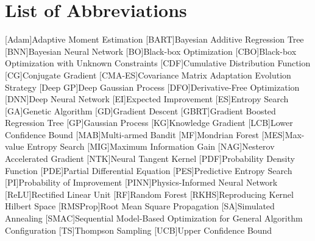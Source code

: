 \chapter*{List of Abbreviations}
{}
\begin{acronym}
        [Adam]{Adaptive Moment Estimation}
        [BART]{Bayesian Additive Regression Tree}
        [BNN]{Bayesian Neural Network}
        [BO]{Black-box Optimization}
        [CBO]{Black-box Optimization with Unknown Constraints}
        [CDF]{Cumulative Distribution Function}
        [CG]{Conjugate Gradient}
        [CMA-ES]{Covariance Matrix Adaptation Evolution Strategy}
        [Deep GP]{Deep Gaussian Process}
        [DFO]{Derivative-Free Optimization}
        [DNN]{Deep Neural Network}
        [EI]{Expected Improvement}
        [ES]{Entropy Search}
        [GA]{Genetic Algorithm}
        [GD]{Gradient Descent}
        [GBRT]{Gradient Boosted Regression Tree}
        [GP]{Gaussian Process}
        [KG]{Knowledge Gradient}
        [LCB]{Lower Confidence Bound}
        [MAB]{Multi-armed Bandit}
        [MF]{Mondrian Forest}
        [MES]{Max-value Entropy Search}
        [MIG]{Maximum Information Gain}
        [NAG]{Nesterov Accelerated Gradient}
        [NTK]{Neural Tangent Kernel}
        [PDF]{Probability Density Function}
        [PDE]{Partial Differential Equation}
        [PES]{Predictive Entropy Search}
        [PI]{Probability of Improvement}
        [PINN]{Physics-Informed Neural Network}
        [ReLU]{Rectified Linear Unit}
        [RF]{Random Forest}
        [RKHS]{Reproducing Kernel Hilbert Space}
        [RMSProp]{Root Mean Square Propagation}
        [SA]{Simulated Annealing}
        [SMAC]{Sequential Model-Based Optimization for General Algorithm Configuration}
        [TS]{Thompson Sampling}
        [UCB]{Upper Confidence Bound}
\end{acronym}
